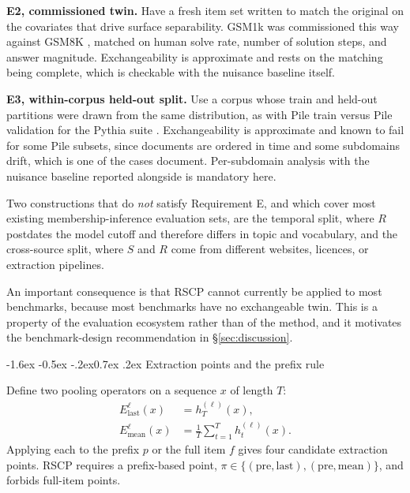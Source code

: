 \documentclass[10pt,twocolumn,letterpaper]{article}
\makeatletter
\renewcommand\subsection{\@startsection{subsection}{2}{\z@}%
  {-1.6ex \@plus -0.5ex \@minus -.2ex}{0.7ex \@plus .2ex}%
  {\normalfont\normalsize\bfseries}}
\makeatother
\begin{document}
\textbf{E2, commissioned twin.} Have a fresh item set written to match the original on the covariates that drive surface separability. GSM1k \cite{zhang2024gsm1k} was commissioned this way against GSM8K \cite{cobbe2021gsm8k}, matched on human solve rate, number of solution steps, and answer magnitude. Exchangeability is approximate and rests on the matching being complete, which is checkable with the nuisance baseline itself.

\textbf{E3, within-corpus held-out split.} Use a corpus whose train and held-out partitions were drawn from the same distribution, as with Pile train versus Pile validation for the Pythia suite \cite{biderman2023pythia,gao2020pile}. Exchangeability is approximate and known to fail for some Pile subsets, since documents are ordered in time and some subdomains drift, which is one of the cases \citet{das2024blind} document. Per-subdomain analysis with the nuisance baseline reported alongside is mandatory here.

Two constructions that do \emph{not} satisfy Requirement E, and which cover most existing membership-inference evaluation sets, are the temporal split, where $R$ postdates the model cutoff and therefore differs in topic and vocabulary, and the cross-source split, where $S$ and $R$ come from different websites, licences, or extraction pipelines.

An important consequence is that RSCP cannot currently be applied to most benchmarks, because most benchmarks have no exchangeable twin. This is a property of the evaluation ecosystem rather than of the method, and it motivates the benchmark-design recommendation in \S\ref{sec:discussion}.

\subsection{Extraction points and the prefix rule}
\label{sec:extraction}

Define two pooling operators on a sequence $x$ of length $T$:
\begin{align}
E^{\ell}_{\mathrm{last}}(x) &= h^{(\ell)}_{T}(x), \\
E^{\ell}_{\mathrm{mean}}(x) &= \tfrac{1}{T}\textstyle\sum_{t=1}^{T} h^{(\ell)}_{t}(x).
\end{align}
Applying each to the prefix $p$ or the full item $f$ gives four candidate extraction points. RSCP requires a prefix-based point, $\pi\in\{(\mathrm{pre},\mathrm{last}),(\mathrm{pre},\mathrm{mean})\}$, and forbids full-item points.
\end{document}
